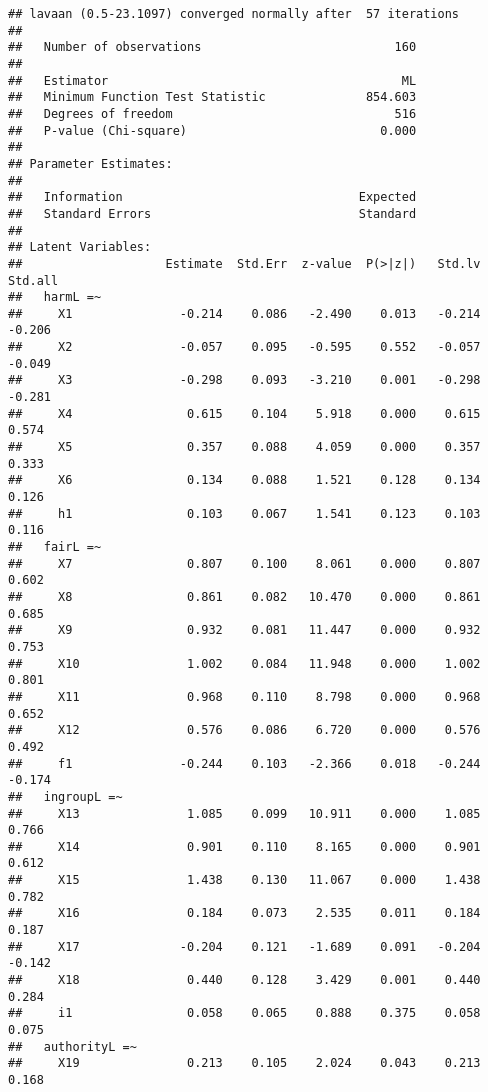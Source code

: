 \documentclass[english,man]{apa6}
\newcounter{author}
\theoremstyle{definition}
\theoremstyle{definition}
\theoremstyle{definition}
\theoremstyle{remark}
\begin{document}
\begin{verbatim}
## lavaan (0.5-23.1097) converged normally after  57 iterations
## 
##   Number of observations                           160
## 
##   Estimator                                         ML
##   Minimum Function Test Statistic              854.603
##   Degrees of freedom                               516
##   P-value (Chi-square)                           0.000
## 
## Parameter Estimates:
## 
##   Information                                 Expected
##   Standard Errors                             Standard
## 
## Latent Variables:
##                    Estimate  Std.Err  z-value  P(>|z|)   Std.lv  Std.all
##   harmL =~                                                              
##     X1               -0.214    0.086   -2.490    0.013   -0.214   -0.206
##     X2               -0.057    0.095   -0.595    0.552   -0.057   -0.049
##     X3               -0.298    0.093   -3.210    0.001   -0.298   -0.281
##     X4                0.615    0.104    5.918    0.000    0.615    0.574
##     X5                0.357    0.088    4.059    0.000    0.357    0.333
##     X6                0.134    0.088    1.521    0.128    0.134    0.126
##     h1                0.103    0.067    1.541    0.123    0.103    0.116
##   fairL =~                                                              
##     X7                0.807    0.100    8.061    0.000    0.807    0.602
##     X8                0.861    0.082   10.470    0.000    0.861    0.685
##     X9                0.932    0.081   11.447    0.000    0.932    0.753
##     X10               1.002    0.084   11.948    0.000    1.002    0.801
##     X11               0.968    0.110    8.798    0.000    0.968    0.652
##     X12               0.576    0.086    6.720    0.000    0.576    0.492
##     f1               -0.244    0.103   -2.366    0.018   -0.244   -0.174
##   ingroupL =~                                                           
##     X13               1.085    0.099   10.911    0.000    1.085    0.766
##     X14               0.901    0.110    8.165    0.000    0.901    0.612
##     X15               1.438    0.130   11.067    0.000    1.438    0.782
##     X16               0.184    0.073    2.535    0.011    0.184    0.187
##     X17              -0.204    0.121   -1.689    0.091   -0.204   -0.142
##     X18               0.440    0.128    3.429    0.001    0.440    0.284
##     i1                0.058    0.065    0.888    0.375    0.058    0.075
##   authorityL =~                                                         
##     X19               0.213    0.105    2.024    0.043    0.213    0.168

\end{verbatim}
\end{document}

